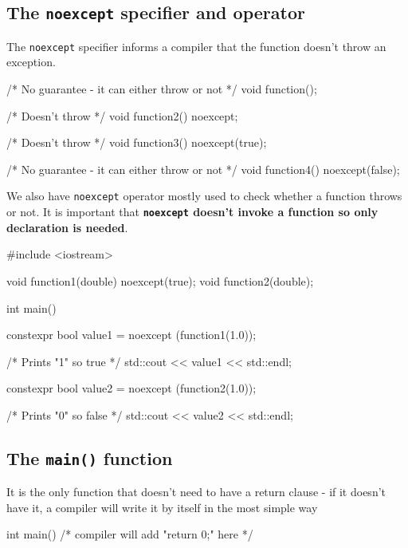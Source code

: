 \documentclass[../main]{subfiles}
\begin{document}
\subsection{The \texttt{noexcept} specifier and operator}
    The \texttt{noexcept} specifier informs a compiler that the function doesn't throw an exception.
\begin{Code}
    /* No guarantee - it can either throw or not */
    void function();

    /* Doesn't throw */
    void function2() noexcept;

    /* Doesn't throw */
    void function3() noexcept(true);

    /* No guarantee - it can either throw or not */
    void function4() noexcept(false);
\end{Code}

    We also have \texttt{noexcept} operator mostly used to check whether a function throws or not. It is important that \textbf{\texttt{noexcept} doesn't invoke a function
so only declaration is needed}.
\begin{Code}
    #include <iostream>
    
    void function1(double) noexcept(true);
    void function2(double);
    
    int main()
    {
        constexpr bool value1 = noexcept (function1(1.0));
        
        /* Prints "1" so true */
        std::cout << value1 << std::endl;
        
        constexpr bool value2 = noexcept (function2(1.0));
        
        /* Prints "0" so false */
        std::cout << value2 << std::endl;
    }
\end{Code}

\subsection{The \texttt{main()} function}
    It is the only function that doesn't need to have a return clause - if it doesn't have it, a compiler will write it by itself in the most simple way
\begin{Code}
    int main()
    {
        /* compiler will add "return 0;" here */
    }
\end{Code}
\end{document}
